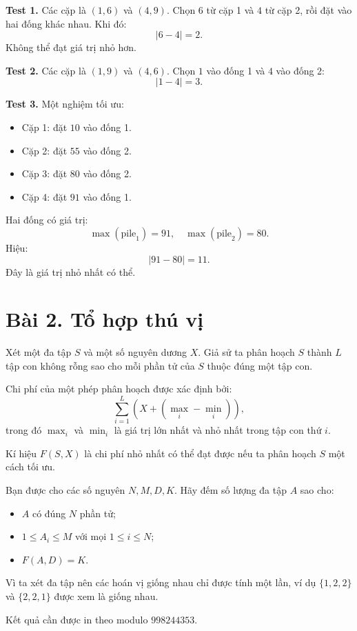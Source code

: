 \textbf{Test 1.}  
Các cặp là $(1, 6)$ và $(4, 9)$.  
Chọn $6$ từ cặp 1 và $4$ từ cặp 2, rồi đặt vào hai đống khác nhau.  
Khi đó:
\[
|6 - 4| = 2.
\]
Không thể đạt giá trị nhỏ hơn.

\textbf{Test 2.}  
Các cặp là $(1,9)$ và $(4,6)$.  
Chọn $1$ vào đống 1 và $4$ vào đống 2:
\[
|1 - 4| = 3.
\]

\textbf{Test 3.}  
Một nghiệm tối ưu:
\begin{itemize}
    \item Cặp 1: đặt $10$ vào đống 1.
    \item Cặp 2: đặt $55$ vào đống 2.
    \item Cặp 3: đặt $80$ vào đống 2.
    \item Cặp 4: đặt $91$ vào đống 1.
\end{itemize}
Hai đống có giá trị:
\[
\max(\text{pile}_1)=91,\quad \max(\text{pile}_2)=80.
\]
Hiệu:
\[
|91 - 80| = 11.
\]
Đây là giá trị nhỏ nhất có thể.

\newpage

\section*{Bài 2. Tổ hợp thú vị}

Xét một đa tập $S$ và một số nguyên dương $X$.  
Giả sử ta phân hoạch $S$ thành $L$ tập con không rỗng sao cho mỗi phần tử của $S$ thuộc đúng một tập con.

Chi phí của một phép phân hoạch được xác định bởi:
\[
\sum_{i=1}^{L} \left( X + (\max_i - \min_i) \right),
\]
trong đó $\max_i$ và $\min_i$ là giá trị lớn nhất và nhỏ nhất trong tập con thứ $i$.

Kí hiệu $F(S, X)$ là chi phí nhỏ nhất có thể đạt được nếu ta phân hoạch $S$ một cách tối ưu.

Bạn được cho các số nguyên $N, M, D, K$.  
Hãy đếm số lượng đa tập $A$ sao cho:

\begin{itemize}
    \item $A$ có đúng $N$ phần tử;
    \item $1 \le A_i \le M$ với mọi $1 \le i \le N$;
    \item $F(A, D) = K$.
\end{itemize}

Vì ta xét đa tập nên các hoán vị giống nhau chỉ được tính một lần, ví dụ  
$\{1,2,2\}$ và $\{2,2,1\}$ được xem là giống nhau.

Kết quả cần được in theo modulo $998244353$.

